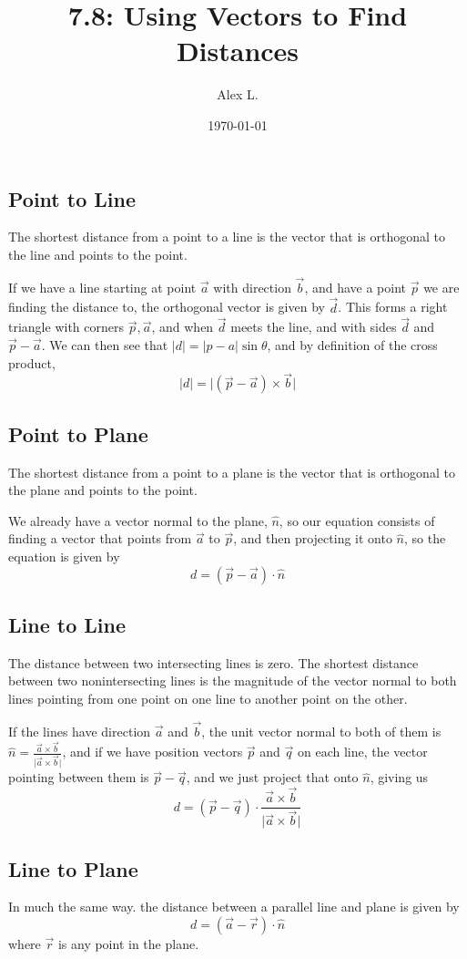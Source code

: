 \documentclass{article}
\title{7.8: Using Vectors to Find Distances}
\author{Alex L.}
\date{\today}
\begin{document}
\maketitle
\subsection{Point to Line}

The shortest distance from a point to a line is the vector that is orthogonal to the line and points to the point. 

If we have a line starting at point $\vec{a}$ with direction $\vec{b}$, and have a point $\vec{p}$ we are finding the distance to, the orthogonal vector is given by $\vec{d}$. This forms a right triangle with corners $\vec{p}, \vec{a}$, and when $\vec{d}$ meets the line, and with sides $\vec{d}$ and $\vec{p} - \vec{a}$. We can then see that $\vert d\vert = \vert p-a\vert\sin\theta$, and by definition of the cross product, $$\vert d\vert = \vert(\vec{p} - \vec{a})\times\vec{b}\vert$$

\subsection{Point to Plane}
The shortest distance from a point to a plane is the vector that is orthogonal to the plane and points to the point.

We already have a vector normal to the plane, $\hat{n}$, so our equation consists of finding a vector that points from $\vec{a}$ to $\vec{p}$, and then projecting it onto $\hat{n}$, so the equation is given by$$d = (\vec{p} - \vec{a})\cdot \hat{n}$$

\subsection{Line to Line}

The distance between two intersecting lines is zero. The shortest distance between two nonintersecting lines is the magnitude of the vector normal to both lines pointing from one point on one line to another point on the other. 

If the lines have direction $\vec{a}$ and $\vec{b}$, the unit vector normal to both of them is $\hat{n} = \frac{\vec{a} \times \vec{b}}{\vert \vec{a}\times\vec{b}\vert}$, and if we have position vectors $\vec{p}$ and $\vec{q}$ on each line, the vector pointing between them is $\vec{p} - \vec{q}$, and we just project that onto $\hat{n}$, giving us$$d = (\vec{p} - \vec{q}) \cdot \frac{\vec{a} \times \vec{b}}{\vert \vec{a}\times\vec{b}\vert}$$

\subsection{Line to Plane}

In much the same way. the distance between a parallel line and plane is given by$$d = (\vec{a} - \vec{r}) \cdot \hat{n}$$where $\vec{r}$ is any point in the plane. 
\end{document}
